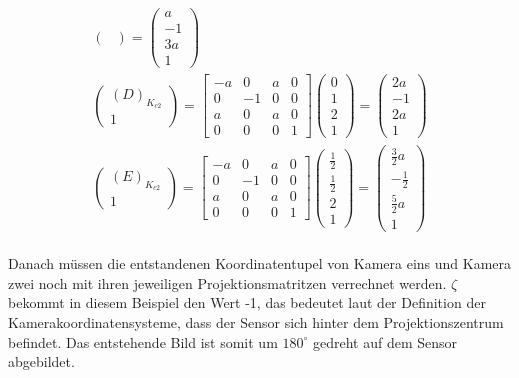 \begin{gather}
\begin{pmatrix}
	\end{pmatrix}
	=
	\begin{pmatrix}
		a\\-1\\3a\\1
	\end{pmatrix}\\
	\begin{pmatrix}
		(D)_{K_{c2}}\\1
	\end{pmatrix}
	=
	\begin{bmatrix}
		-a&0&a&0\\
		0&-1&0&0\\
		a&0&a&0\\
		0&0&0&1
	\end{bmatrix}
	\begin{pmatrix}
		0\\1\\2\\1
	\end{pmatrix}
	=
	\begin{pmatrix}
		2a\\-1\\2a\\1
	\end{pmatrix}\\
	\begin{pmatrix}
	(E)_{K_{c2}}\\1
\end{pmatrix}
=
\begin{bmatrix}
	-a&0&a&0\\
	0&-1&0&0\\
	a&0&a&0\\
	0&0&0&1
\end{bmatrix}
\begin{pmatrix}
	\frac{1}{2}\\\frac{1}{2}\\2\\1
\end{pmatrix}
=
\begin{pmatrix}
	\frac{3}{2}a\\-\frac{1}{2}\\\frac{5}{2}a\\1
\end{pmatrix}
\end{gather}\\

Danach müssen die entstandenen Koordinatentupel von Kamera eins und Kamera zwei noch mit ihren jeweiligen Projektionsmatritzen verrechnet werden. $\zeta$ bekommt in diesem Beispiel den Wert -1, das bedeutet laut der Definition der Kamerakoordinatensysteme, dass der Sensor sich hinter dem Projektionszentrum befindet. Das entstehende Bild ist somit um \ensuremath{180^\circ} gedreht auf dem Sensor abgebildet.

